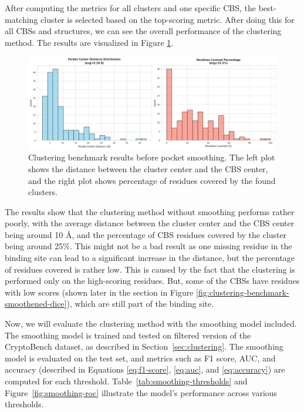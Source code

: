 After computing the metrics for all clusters and one specific CBS, the best-matching cluster is selected based on the top-scoring metric. After doing this for all CBSs and structures, we can see the overall performance of the clustering method. The results are visualized in Figure \ref{fig:clustering-benchmark}.

\begin{figure}[htbp]
    \centering
    \includegraphics[width=\textwidth]{img/non-smoothened-1.png}
    \caption{Clustering benchmark results before pocket smoothing. The left plot shows the distance between the cluster center and the CBS center, and the right plot shows percentage of residues covered by the found clusters.}
    \label{fig:clustering-benchmark}
\end{figure}

The results show that the clustering method without smoothing performs rather poorly, with the average distance between the cluster center and the CBS center being around 10 \AA, and the percentage of CBS residues covered by the cluster being around 25\%. This might not be a bad result as one missing residue in the binding site can lead to a significant increase in the distance, but the percentage of residues covered is rather low. This is caused by the fact that the clustering is performed only on the high-scoring residues. But, some of the CBSs have residues with low scores (shown later in the section in Figure \ref{fig:clustering-benchmark-smoothened-dice}), which are still part of the binding site.

Now, we will evaluate the clustering method with the smoothing model included. The smoothing model is trained and tested on filtered version of the CryptoBench dataset, as described in Section~\ref{sec:clustering}. The smoothing model is evaluated on the test set, and metrics such as F1 score, AUC, and accuracy (described in Equations \ref{eq:f1-score}, \ref{eq:auc}, and \ref{eq:accuracy}) are computed for each threshold. Table~\ref{tab:smoothing-thresholds} and Figure~\ref{fig:smoothing-roc} illustrate the model's performance across various thresholds.

